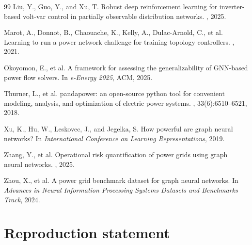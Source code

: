 \documentclass{article}
\begin{document}
\begin{thebibliography}{99}
Liu, Y., Guo, Y., and Xu, T.
\newblock Robust deep reinforcement learning for inverter-based volt-var
  control in partially observable distribution networks.
, 2025.

Marot, A., Donnot, B., Chaouache, K., Kelly, A., Dulac-Arnold, C., et al.
\newblock Learning to run a power network challenge for training topology
  controllers.
, 2021.

Okoyomon, E., et al.
\newblock A framework for assessing the generalizability of GNN-based power
  flow solvers.
\newblock In {\em e-Energy 2025}, ACM, 2025.

Thurner, L., et al.
\newblock pandapower: an open-source python tool for convenient modeling,
  analysis, and optimization of electric power systems.
, 33(6):6510--6521, 2018.

Xu, K., Hu, W., Leskovec, J., and Jegelka, S.
\newblock How powerful are graph neural networks?
\newblock In {\em International Conference on Learning Representations},
  2019.

Zhang, Y., et al.
\newblock Operational risk quantification of power grids using graph neural
  networks.
, 2025.

Zhou, X., et al.
\newblock A power grid benchmark dataset for graph neural networks.
\newblock In {\em Advances in Neural Information Processing Systems
  Datasets and Benchmarks Track}, 2024.

\end{thebibliography}

\appendix
\section{Reproduction statement}
\label{app:repro}
\end{document}
